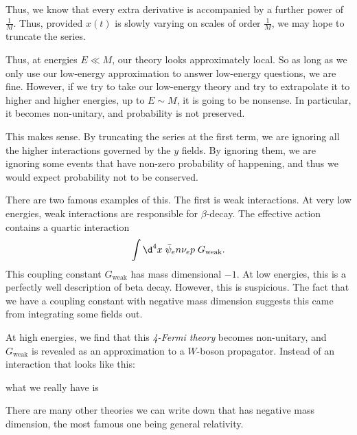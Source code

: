 \documentclass[a4paper]{article}
\begin{document}
Thus, we know that every extra derivative is accompanied by a further power of $\frac{1}{M}$. Thus, provided $x(t)$ is slowly varying on scales of order $\frac{1}{M}$, we may hope to truncate the series.

Thus, at energies $E \ll M$, our theory looks approximately local. So as long as we only use our low-energy approximation to answer low-energy questions, we are fine. However, if we try to take our low-energy theory and try to extrapolate it to higher and higher energies, up to $E \sim M$, it is going to be nonsense. In particular, it becomes non-unitary, and probability is not preserved.

This makes sense. By truncating the series at the first term, we are ignoring all the higher interactions governed by the $y$ fields. By ignoring them, we are ignoring some events that have non-zero probability of happening, and thus we would expect probability not to be conserved.

There are two famous examples of this. The first is weak interactions. At very low energies, weak interactions are responsible for $\beta$-decay. The effective action contains a quartic interaction
\[
  \int \d^4 x\; \bar\psi_e n \nu_e p \; G_{\mathrm{weak}}.
\]
This coupling constant $G_{\mathrm{weak}}$ has mass dimensional $-1$. At low energies, this is a perfectly well description of beta decay. However, this is suspicious. The fact that we have a coupling constant with negative mass dimension suggests this came from integrating some fields out.

At high energies, we find that this \emph{4-Fermi theory} becomes non-unitary, and $G_{\mathrm{weak}}$ is revealed as an approximation to a $W$-boson propagator. Instead of an interaction that looks like this:
\begin{center}
\end{center}
what we really have is
\begin{center}
\end{center}
There are many other theories we can write down that has negative mass dimension, the most famous one being general relativity.
\end{document}

